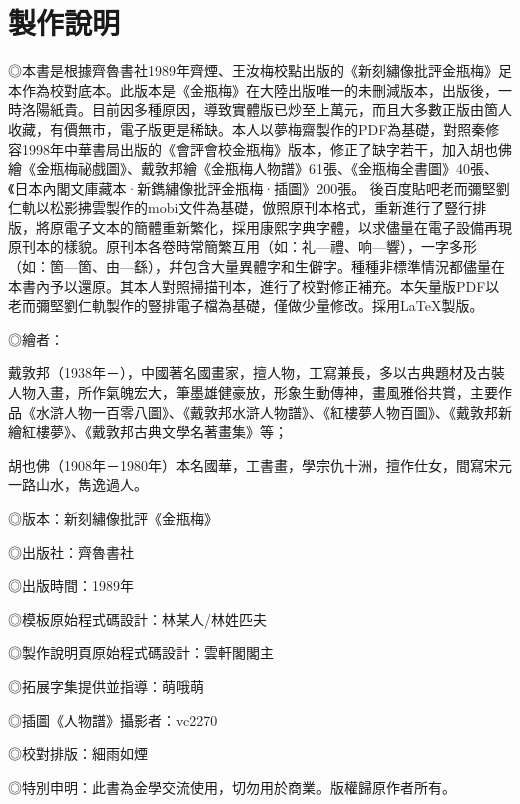 \chapter*{製作說明}


◎本書是根據齊魯書社1989年齊煙、王汝梅校點出版的《新刻繡像批評金瓶梅》足本作為校對底本。此版本是《金瓶梅》在大陸出版唯一的未刪減版本，出版後，一時洛陽紙貴。目前因多種原因，導致實體版已炒至上萬元，而且大多數正版由箇人收藏，有價無市，電子版更是稀缺。本人以夢梅齋製作的PDF為基礎，對照秦修容1998年中華書局出版的《會評會校金瓶梅》版本，修正了缺字若干，加入胡也佛繪《金瓶梅祕戲圖》、戴敦邦繪《金瓶梅人物譜》61張、《金瓶梅全書圖》40張、《日本內閣文庫藏本·新鐫繡像批評金瓶梅·插圖》200張。
後百度貼吧老而彌堅劉仁軌以松影拂雲製作的mobi文件為基礎，倣照原刊本格式，重新進行了豎行排版，將原電子文本的簡體重新繁化，採用康熙字典字體，以求儘量在電子設備再現原刊本的樣貌。原刊本各卷時常簡繁互用（如：礼—禮、响—響），一字多形（如：箇—箇、由—繇），幷包含大量異體字和生僻字。種種非標準情況都儘量在本書內予以還原。其本人對照掃描刊本，進行了校對修正補充。本矢量版PDF以老而彌堅劉仁軌製作的豎排電子檔為基礎，僅做少量修改。採用{\LaTeX}製版。

◎繪者：

戴敦邦（1938年－），中國著名國畫家，擅人物，工寫兼長，多以古典題材及古裝人物入畫，所作氣魄宏大，筆墨雄健豪放，形象生動傳神，畫風雅俗共賞，主要作品《水滸人物一百零八圖》、《戴敦邦水滸人物譜》、《紅樓夢人物百圖》、《戴敦邦新繪紅樓夢》、《戴敦邦古典文學名著畫集》等；

胡也佛（1908年－1980年）本名國華，工書畫，學宗仇十洲，擅作仕女，間寫宋元一路山水，雋逸過人。

◎版本：新刻繡像批評《金瓶梅》

◎出版社：齊魯書社

◎出版時間：1989年

◎模板原始程式碼設計：林某人/林姓匹夫

◎製作說明頁原始程式碼設計：雲軒閣閣主

◎拓展字集提供並指導：萌哦萌

◎插圖《人物譜》攝影者：vc2270

◎校對排版：細雨如煙

◎特別申明：此書為金學交流使用，切勿用於商業。版權歸原作者所有。

\begin{quotation}
\raggedleft\small\kaishu\color{gray}{庚子歲正月製書於米國山景城}
\end{quotation}

{\insertauthorlogo}